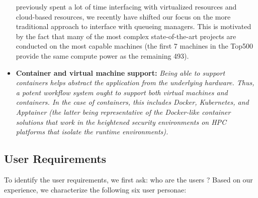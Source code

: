 \documentclass[sigconf]{acmart}
\begin{document}
\begin{BOX}
\begin{itemize}
{    previously spent a lot of time interfacing with virtualized
    resources and cloud-based resources, we recently have shifted our
    focus on the more traditional approach to interface with queueing
    managers. This is motivated by the fact that many of the
    most complex state-of-the-art projects are conducted on the most
    capable machines (the first 7 machines in the Top500 provide the
    same compute power as the remaining 493).}
 \item {\bf Container and virtual machine support:} {\it
     Being able to support containers helps abstract the application from the underlying hardware. Thus, a potent workflow system ought to
     support both virtual machines and containers. In the case of containers, this includes Docker, Kubernetes, and Apptainer (the latter being representative of the Docker-like container solutions that work in the heightened security environments on HPC platforms that isolate the runtime environments).}
  \end{itemize}
\end{BOX}

\subsection{User Requirements}
\label{sec:user-requirements}

To identify the user requirements, we first ask: who are the users \citep{wilkinson2022-2}? Based on our experience, we characterize the following six user personae:
\end{document}
